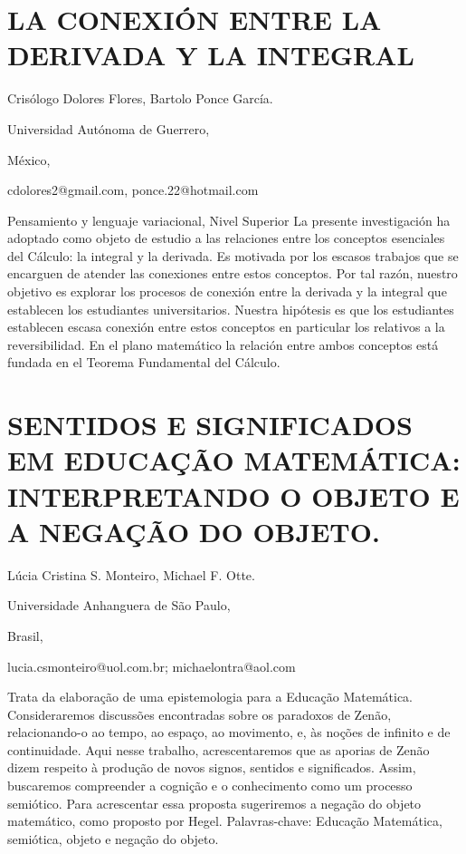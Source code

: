 \section{LA CONEXIÓN ENTRE LA DERIVADA Y LA INTEGRAL}

\begin{datos}

Crisólogo Dolores Flores, Bartolo Ponce García.

Universidad Autónoma de Guerrero, 

México,

cdolores2@gmail.com, ponce.22@hotmail.com

\end{datos}

Pensamiento y lenguaje variacional, Nivel Superior La presente investigación
ha adoptado como objeto de estudio a las relaciones entre los conceptos
esenciales del Cálculo: la integral y la derivada. Es motivada por
los escasos trabajos que se encarguen de atender las conexiones entre
estos conceptos. Por tal razón, nuestro objetivo es explorar los procesos
de conexión entre la derivada y la integral que establecen los estudiantes
universitarios. Nuestra hipótesis es que los estudiantes establecen
escasa conexión entre estos conceptos en particular los relativos
a la reversibilidad. En el plano matemático la relación entre ambos
conceptos está fundada en el Teorema Fundamental del Cálculo. 

\setcounter{section}{154}


\section{SENTIDOS E SIGNIFICADOS EM EDUCAÇÃO MATEMÁTICA: INTERPRETANDO O OBJETO
E A NEGAÇÃO DO OBJETO.}

\begin{datos}

Lúcia Cristina S. Monteiro, Michael F. Otte.

Universidade Anhanguera de São Paulo,

Brasil,

lucia.csmonteiro@uol.com.br; michaelontra@aol.com 

\end{datos}

Trata da elaboração de uma epistemologia para a Educação Matemática.
Consideraremos discussões encontradas sobre os paradoxos de Zenão,
relacionando-o ao tempo, ao espaço, ao movimento, e, às noções de
infinito e de continuidade. Aqui nesse trabalho, acrescentaremos que
as aporias de Zenão dizem respeito à produção de novos signos, sentidos
e significados. Assim, buscaremos compreender a cognição e o conhecimento
como um processo semiótico. Para acrescentar essa proposta sugeriremos
a negação do objeto matemático, como proposto por Hegel. Palavras-chave:
Educação Matemática, semiótica, objeto e negação do objeto.

